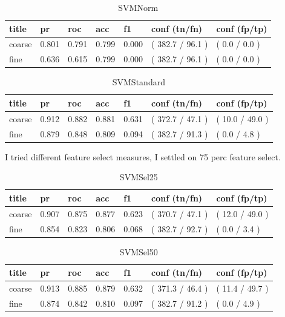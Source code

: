 \documentclass[ms]{nuthesis}
\begin{document}
\FloatBarrier
\begin{table}[H]
\centering
\begin{tabular}{|l||l||l||l||l||l||l|}\toprule
title & pr & roc & acc & f1 & conf (tn/fn) & conf (fp/tp) \\ \midrule
coarse & 0.801 & 0.791 & 0.799 & 0.000 & ( 382.7 / 96.1 ) & ( 0.0 / 0.0 ) \\
fine & 0.636 & 0.615 & 0.799 & 0.000 & ( 382.7 / 96.1 ) & ( 0.0 / 0.0 ) \\ \bottomrule
\end{tabular}
\caption{SVMNorm}
\label{tab:SVMNorm}
\end{table}
\FloatBarrier

\FloatBarrier
\begin{table}[H]
\centering
\begin{tabular}{|l||l||l||l||l||l||l|}\toprule
title & pr & roc & acc & f1 & conf (tn/fn) & conf (fp/tp) \\ \midrule
coarse & 0.912 & 0.882 & 0.881 & 0.631 & ( 372.7 / 47.1 ) & ( 10.0 / 49.0 ) \\
fine & 0.879 & 0.848 & 0.809 & 0.094 & ( 382.7 / 91.3 ) & ( 0.0 / 4.8 ) \\ \bottomrule
\end{tabular}
\caption{SVMStandard}
\label{tab:SVMStandard}
\end{table}
\FloatBarrier




\par I tried different feature select measures, I settled on 75 perc feature select.

\FloatBarrier
\begin{table}[H]
\centering
\begin{tabular}{|l||l||l||l||l||l||l|}\toprule
title & pr & roc & acc & f1 & conf (tn/fn) & conf (fp/tp) \\ \midrule
coarse & 0.907 & 0.875 & 0.877 & 0.623 & ( 370.7 / 47.1 ) & ( 12.0 / 49.0 ) \\
fine & 0.854 & 0.823 & 0.806 & 0.068 & ( 382.7 / 92.7 ) & ( 0.0 / 3.4 ) \\ \bottomrule
\end{tabular}
\caption{SVMSel25}
\label{tab:SVMSel25}
\end{table}
\FloatBarrier


\FloatBarrier
\begin{table}[H]
\centering
\begin{tabular}{|l||l||l||l||l||l||l|}\toprule
title & pr & roc & acc & f1 & conf (tn/fn) & conf (fp/tp) \\ \midrule
coarse & 0.913 & 0.885 & 0.879 & 0.632 & ( 371.3 / 46.4 ) & ( 11.4 / 49.7 ) \\
fine & 0.874 & 0.842 & 0.810 & 0.097 & ( 382.7 / 91.2 ) & ( 0.0 / 4.9 ) \\ \bottomrule
\end{tabular}
\caption{SVMSel50}
\label{tab:SVMSel50}
\end{table}
\FloatBarrier
\end{document}
